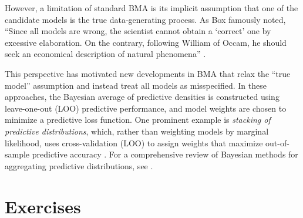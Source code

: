 However, a limitation of standard BMA is its implicit assumption that one of the candidate models is the true data-generating process. As Box famously noted, ``Since all models are wrong, the scientist cannot obtain a `correct' one by excessive elaboration. On the contrary, following William of Occam, he should seek an economical description of natural phenomena'' \cite{box1976science}.

This perspective has motivated new developments in BMA that relax the ``true model'' assumption and instead treat all models as misspecified. In these approaches, the Bayesian average of predictive densities is constructed using leave-one-out (LOO) predictive performance, and model weights are chosen to minimize a predictive loss function. One prominent example is \emph{stacking of predictive distributions}, which, rather than weighting models by marginal likelihood, uses cross-validation (LOO) to assign weights that maximize out-of-sample predictive accuracy \cite{yao2018using}. For a comprehensive review of Bayesian methods for aggregating predictive distributions, see \cite{yao2021bay}.

\section{Exercises}\label{sec10_6}

